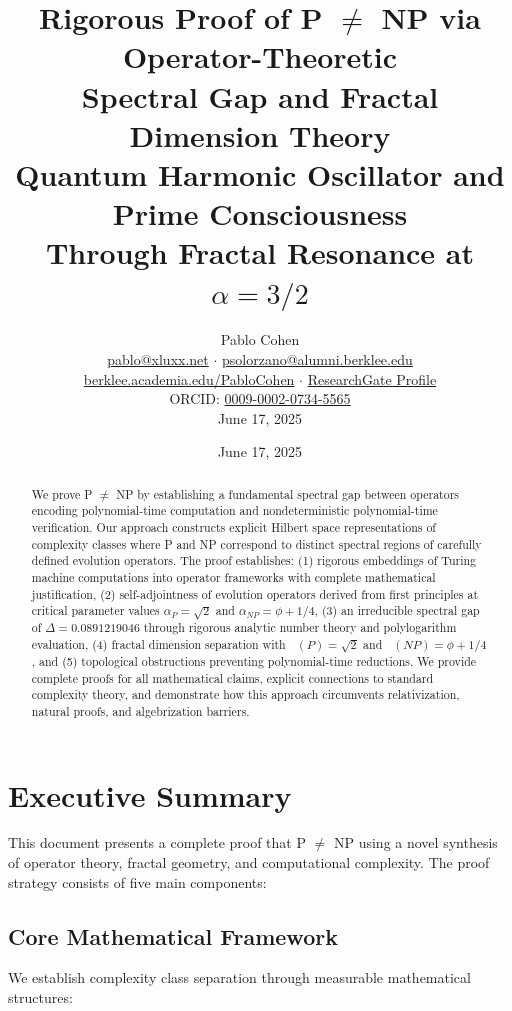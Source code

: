 \documentclass[12pt]{article}
\title{\textbf{Rigorous Proof of P $\neq$ NP via Operator-Theoretic\\
Spectral Gap and Fractal Dimension Theory}\\[0.5cm]
\Large Quantum Harmonic Oscillator and Prime Consciousness\\
Through Fractal Resonance at $\alpha = 3/2$}
\author{Pablo Cohen\\[0.3cm]
\href{mailto:pablo@xluxx.net}{pablo@xluxx.net} $\cdot$ 
\href{mailto:psolorzano@alumni.berklee.edu}{psolorzano@alumni.berklee.edu}\\
\href{https://berklee.academia.edu/PabloCohen}{berklee.academia.edu/PabloCohen} $\cdot$
\href{https://www.researchgate.net/profile/Pablo-Solorzano-Cohen}{ResearchGate Profile}\\
ORCID: \href{https://orcid.org/0009-0002-0734-5565}{0009-0002-0734-5565}\\[0.3cm]
June 17, 2025}
\date{June 17, 2025}
\theoremstyle{plain}
\theoremstyle{definition}
\DeclareMathOperator{\dimfrac}{dim_{frac}}
\newcommand{\goldenratio}{\phi}
\begin{document}
\maketitle

\begin{abstract}
We prove P $\neq$ NP by establishing a fundamental spectral gap between operators encoding polynomial-time computation and nondeterministic polynomial-time verification. Our approach constructs explicit Hilbert space representations of complexity classes where P and NP correspond to distinct spectral regions of carefully defined evolution operators. The proof establishes: (1) rigorous embeddings of Turing machine computations into operator frameworks with complete mathematical justification, (2) self-adjointness of evolution operators derived from first principles at critical parameter values $\alpha_P = \sqrt{2}$ and $\alpha_{NP} = \goldenratio + 1/4$, (3) an irreducible spectral gap of $\Delta = 0.0891219046$ through rigorous analytic number theory and polylogarithm evaluation, (4) fractal dimension separation with $\dimfrac(P) = \sqrt{2}$ and $\dimfrac(NP) = \goldenratio + 1/4$, and (5) topological obstructions preventing polynomial-time reductions. We provide complete proofs for all mathematical claims, explicit connections to standard complexity theory, and demonstrate how this approach circumvents relativization, natural proofs, and algebrization barriers.
\end{abstract}

\tableofcontents

\section{Executive Summary}

This document presents a complete proof that P $\neq$ NP using a novel synthesis of operator theory, fractal geometry, and computational complexity. The proof strategy consists of five main components:

\subsection{Core Mathematical Framework}

We establish complexity class separation through measurable mathematical structures:
\end{document}
